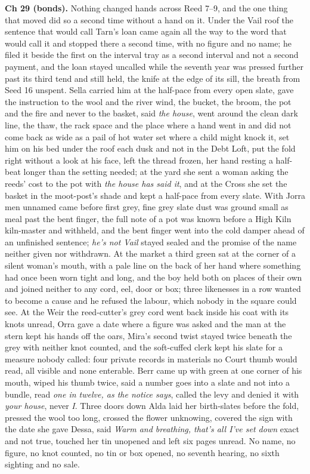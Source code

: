 \documentclass{design/chronicle}
\begin{document}
{\textbf{Ch 29 (bonds).} Nothing changed hands across Reed 7–9, and the one thing that moved did so a second time without a hand on it. Under the Vail roof the sentence that would call Tarn’s loan came again all the way to the word that would call it and stopped there a second time, with no figure and no name; he filed it beside the first on the interval tray as a second interval and not a second payment, and the loan stayed uncalled while the seventh year was pressed further past its third tend and still held, the knife at the edge of its sill, the breath from Seed 16 unspent. Sella carried him at the half-pace from every open slate, gave the instruction to the wool and the river wind, the bucket, the broom, the pot and the fire and never to the basket, said \emph{the house}, went around the clean dark line, the thaw, the rack space and the place where a hand went in and did not come back as wide as a pail of hot water set where a child might knock it, set him on his bed under the roof each dusk and not in the Debt Loft, put the fold right without a look at his face, left the thread frozen, her hand resting a half-beat longer than the setting needed; at the yard she sent a woman asking the reeds’ cost to the pot with \emph{the house has said it}, and at the Cross she set the basket in the moot-post’s shade and kept a half-pace from every slate. With Jorra men unnamed came before first grey, fine grey slate dust was ground small as meal past the bent finger, the full note of a pot was known before a High Kiln kiln-master and withheld, and the bent finger went into the cold damper ahead of an unfinished sentence; \emph{he’s not Vail} stayed sealed and the promise of the name neither given nor withdrawn. At the market a third green sat at the corner of a silent woman’s mouth, with a pale line on the back of her hand where something had once been worn tight and long, and the boy held both on places of their own and joined neither to any cord, eel, door or box; three likenesses in a row wanted to become a cause and he refused the labour, which nobody in the square could see. At the Weir the reed-cutter’s grey cord went back inside his coat with its knots unread, Orra gave a date where a figure was asked and the man at the stern kept his hands off the oars, Mira’s second twist stayed twice beneath the grey with neither knot counted, and the soft-cuffed clerk kept his slate for a measure nobody called: four private records in materials no Court thumb would read, all visible and none enterable. Berr came up with green at one corner of his mouth, wiped his thumb twice, said a number goes into a slate and not into a bundle, read \emph{one in twelve, as the notice says}, called the levy and denied it with \emph{your house}, never \emph{I}. Three doors down Alda laid her birth-slates before the fold, pressed the wool too long, crossed the flower unknowing, covered the sign with the date she gave Dessa, said \emph{Warm and breathing, that’s all I’ve set down} exact and not true, touched her tin unopened and left six pages unread. No name, no figure, no knot counted, no tin or box opened, no seventh hearing, no sixth sighting and no sale.

}
\end{document}
